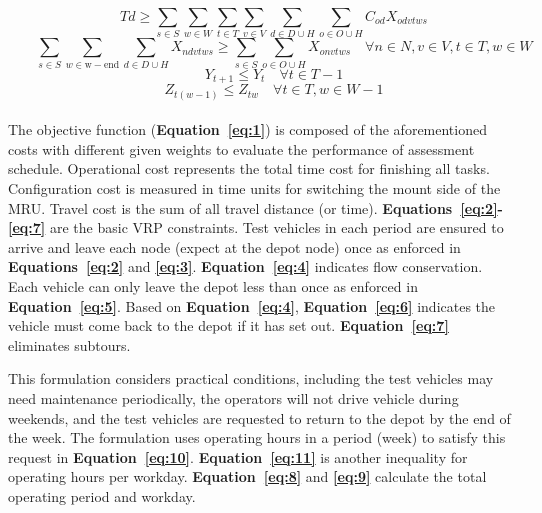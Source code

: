 \documentclass[numbered]{trbunofficial}
\begin{document}
\begin{equation}
    \qquad 
    T d \geq \sum_{s\in S} \sum_{w\in W} \sum_{t\in T} \sum_{v\in V} \sum_{d\in D\cup H} \sum_{o\in O\cup H} C_{o d}X_{o d v t w s} \label{eq:14}
\end{equation}
\begin{equation}
    \qquad 
    \sum_{s\in S} \sum_{w \in \mathrm{w}-\mathrm{end}} \sum_{d\in D\cup H} X_{n d v t w s} \geq \sum_{s\in S} \sum_{o\in O \cup H} X_{o n v t w s} \quad \forall n \in N, v \in V, t \in T, w \in W \label{eq:15}
\end{equation}
\begin{equation}
    \qquad 
    Y_{t+1} \leq Y_{t} \quad \forall t \in T-1 \label{eq:16}
\end{equation}
\begin{equation}
    \qquad 
    Z_{t(w-1)} \leq Z_{t w} \quad \forall t \in T, w\in W-1 \label{eq:17}
\end{equation}
\\
The objective function (\textbf{Equation~\ref{eq:1}}) is composed of the aforementioned costs with different given weights to evaluate the performance of assessment schedule. Operational cost represents the total time cost for finishing all tasks. Configuration cost is measured in time units for switching the mount side of the MRU. Travel cost is the sum of all travel distance (or time).
\textbf{Equations~\ref{eq:2}-\ref{eq:7}} are the basic VRP constraints. Test vehicles in each period are ensured to arrive and leave each node (expect at the depot node) once as enforced in \textbf{Equations~\ref{eq:2}} and \textbf{\ref{eq:3}}. \textbf{Equation~\ref{eq:4}} indicates flow conservation. Each vehicle can only leave the depot less than once as enforced in \textbf{Equation~\ref{eq:5}}. Based on \textbf{Equation~\ref{eq:4}}, \textbf{Equation~\ref{eq:6}} indicates the vehicle must come back to the depot if it has set out. \textbf{Equation~\ref{eq:7}} eliminates subtours.

This formulation considers practical conditions, including the test vehicles may need maintenance periodically, the operators will not drive vehicle during weekends, and the test vehicles are requested to return to the depot by the end of the week. The formulation uses operating hours in a period (week) to satisfy this request in \textbf{Equation~\ref{eq:10}}. \textbf{Equation~\ref{eq:11}} is another inequality for operating hours per workday. \textbf{Equation~\ref{eq:8}} and \textbf{\ref{eq:9}} calculate the total operating period and workday.
\end{document}
